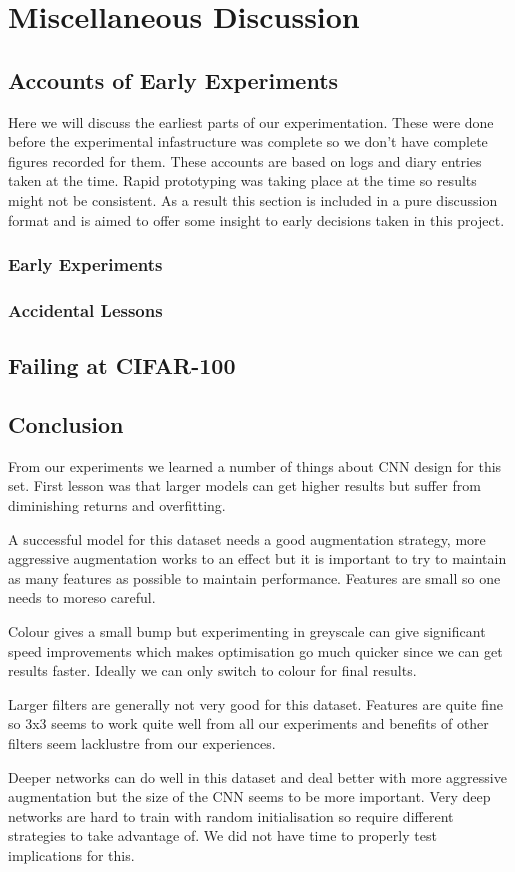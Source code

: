 \section{Miscellaneous Discussion}
\subsection{Accounts of Early Experiments}
Here we will discuss the earliest parts of our experimentation. These were done before the experimental infastructure was complete so we don't have complete figures recorded for them. These accounts are based on logs and diary entries taken at the time. Rapid prototyping was taking place at the time so results might not be consistent. As a result this section is included in a pure discussion format and is aimed to offer some insight to early decisions taken in this project.

\subsubsection{Early Experiments}

\subsubsection{Accidental Lessons}

\subsection{Failing at CIFAR-100}

\subsection{Conclusion}
From our experiments we learned a number of things about CNN design for this set. First lesson was that larger models can get higher results but suffer from diminishing returns and overfitting.

A successful model for this dataset needs a good augmentation strategy, more aggressive augmentation works to an effect but it is important to try to maintain as many features as possible to maintain performance. Features are small so one needs to moreso careful.

Colour gives a small bump but experimenting in greyscale can give significant speed improvements which makes optimisation go much quicker since we can get results faster. Ideally we can only switch to colour for final results.

Larger filters are generally not very good for this dataset. Features are quite fine so 3x3 seems to work quite well from all our experiments and benefits of other filters seem lacklustre from our experiences.

Deeper networks can do well in this dataset and deal better with more aggressive augmentation but the size of the CNN seems to be more important. Very deep networks are hard to train with random initialisation so require different strategies to take advantage of. We did not have time to properly test implications for this.
